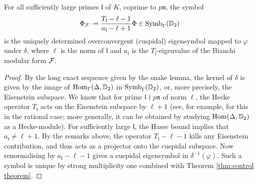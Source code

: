 \documentclass[a4paper,11pt]{article}
\numberwithin{equation}{section}
\newcommand{\fn}{\mathfrak{n}}
\begin{document}
\begin{proposition}
	For all sufficiently large primes $\mathfrak{l}$ of $K$, coprime to $p\fn$, the symbol
	\[
		\Phi_{\f} \defeq \frac{T_{\mathfrak{l}} - \ell - 1}{a_{\mathfrak{l}} - \ell + 1} \Phi \in \Symb_\Gamma(\D_2)
	\]
	is the uniquely determined overconvergent (cuspidal) eigensymbol mapped to $\varphi$ under $\delta$, where $\ell$ is the norm of $\mathfrak{l}$ and $a_{\mathfrak{l}}$ is the $T_{\mathfrak{l}}$-eigenvalue of the Bianchi modular form $\mathcal{F}$.
\end{proposition}
\begin{proof}
By the long exact sequence given by the snake lemma, the kernel of $\delta$ is given by the image of $\mathrm{Hom}_\Gamma(\Delta,\mathbb{D}_2)$ in $\mathrm{Symb}_\Gamma(\mathbb{D}_2)$, or, more precisely, the Eisenstein subspace. We know that for prime $\mathfrak{l}\nmid p\fn$ of norm $\ell$, the Hecke operator $T_{\mathfrak{l}}$ acts on the Eisenstein subspace by $\ell + 1$ (see, for example, \cite[Rem.~5.2]{PS11} for this in the rational case; more generally, it can be obtained by studying $\mathrm{Hom}(\Delta,\mathbb{D}_2)$ as a Hecke-module). For sufficiently large $\mathfrak{l}$, the Hasse bound implies that $a_{\mathfrak{l}} \neq \ell + 1$. By the remarks above, the operator $T_{\mathfrak{l}} - \ell -1$ kills any Eisenstein contribution, and thus acts as a projector onto the cuspidal subspace. Now renormalising by $a_{\mathfrak{l}} - \ell - 1$ gives a cuspidal eigensymbol in $\delta^{-1}(\varphi)$. Such a symbol is unique by strong multiplicity one combined with Theorem \ref{thm:control theorem}.
\end{proof}
\end{document}
